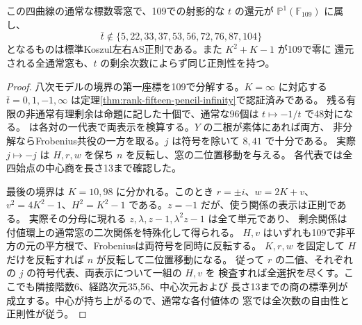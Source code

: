 \begin{proposition}\label{prop:rank-fifteen-octic-residues}
この四曲線の通常な標数零窓で、109での射影的な $t$ の還元が
$\mathbb P^1(\mathbb F_{109})$ に属し、
\[
 \bar t\notin\{5,22,33,37,53,56,72,76,87,104\}
\]
となるものは標準Koszul左右AS正則である。また $K^2+K-1$ が109で零に
還元される全通常窓も、$t$ の剰余次数によらず同じ正則性を持つ。
\end{proposition}
\begin{proof}
八次モデルの境界の第一座標を109で分解する。$K=\infty$ に対応する
$\bar t=0,1,-1,\infty$ は定理\ref{thm:rank-fifteen-pencil-infinity}で認証済みである。
残る有限の非通常有理剰余は命題に記した十個で、通常な96個は
$t\mapsto-1/t$ で48対になる。
は各対の一代表で両表示を検算する。$Y$ の二根が素体にあれば両方、
非分解ならFrobenius共役の一方を取る。$j$ は符号を除いて $8,41$ で十分である。
実際 $j\mapsto-j$ は $H,r,w$ を保ち $n$ を反転し、窓の二位置移動を与える。
各代表では全四始点の中心商を長さ13まで確認した。

最後の境界は $K=10,98$ に分かれる。このとき $r=\pm i$、$w=2K+v$、
$v^2=4K^2-1$、$H^2=K^2-1$ である。$z=-1$ だが、使う関係の表示は正則である。
実際その分母に現れる $z,\lambda,z-1,\lambda^2 z-1$ は全て単元であり、
剰余関係は付値環上の通常窓の二次関係を特殊化して得られる。
$H,v$ はいずれも109で非平方の元の平方根で、Frobeniusは両符号を同時に反転する。
$K,r,w$ を固定して $H$ だけを反転すれば $n$ が反転して二位置移動になる。
従って $r$ の二値、それぞれの $j$ の符号代表、両表示について一組の $H,v$ を
検査すれば全選択を尽くす。ここでも隣接階数6、経路次元35,56、中心次元および
長さ13までの商の標準列が成立する。中心が持ち上がるので、通常な各付値体の
窓では全次数の自由性と正則性が従う。
\end{proof}
